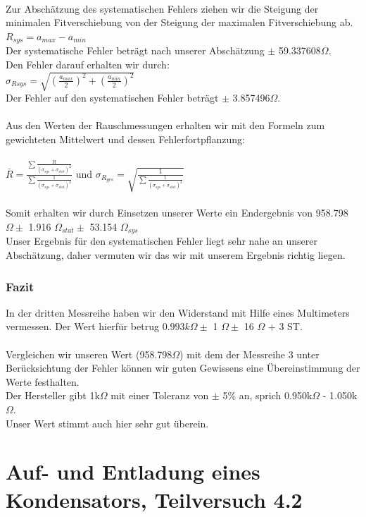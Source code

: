 \documentclass[12pt,a4paper]{article}
\begin{document}
\\Zur Abschätzung des systematischen Fehlers ziehen wir die Steigung der minimalen Fitverschiebung von der Steigung der maximalen Fitverschiebung ab.\\  
$R_{sys} = a_{max} - a_{min}$\\
Der systematische Fehler beträgt nach unserer Abschätzung $\pm$ 59.337608$\Omega$.\\ 
Den Fehler darauf erhalten wir durch:\\
$\sigma_{R sys} = \sqrt{(\frac{a_{max}}{2})^2+(\frac{a_{min}}{2})^2}$\\
Der Fehler auf den systematischen Fehler beträgt $\pm$ 3.857496$\Omega$.\\
\\Aus den Werten der Rauschmessungen erhalten wir mit den Formeln zum gewichteten Mittelwert und dessen Fehlerfortpflanzung:\\
\\$\bar{R} = \frac{\sum{\frac{R}{(\sigma_{sys}+\sigma_{stat})^2}}}{\sum{\frac{1}{(\sigma_{sys}+\sigma_{stat})^2}}}$ und $\sigma_{R_{ges}} = \sqrt{\frac{1}{\sum{\frac{1}{(\sigma_{sys}+\sigma_{stat})^2}}}}$\\
\\Somit erhalten wir durch Einsetzen unserer Werte ein Endergebnis von 958.798$\Omega \pm$ 1.916 $\Omega_{stat} \pm$ 53.154 $\Omega_{sys}$\\
Unser Ergebnis für den systematischen Fehler liegt sehr nahe an unserer Abschätzung, daher vermuten wir das wir mit unserem Ergebnis richtig liegen.\\ 
\subsubsection{Fazit}
In der dritten Messreihe haben wir den Widerstand mit Hilfe eines Multimeters vermessen. Der Wert hierfür betrug $0.993 k\Omega \pm$ 1 $\Omega \pm$ 16 $\Omega$ + 3 ST. \\ 
\\Vergleichen wir unseren Wert (958.798$\Omega$) mit dem der Messreihe 3 unter Berücksichtung der Fehler können wir guten Gewissens eine Übereinstimmung der Werte festhalten. 
\\Der Hersteller gibt 1k$\Omega$ mit einer Toleranz von $\pm$ 5\% an, sprich 0.950k$\Omega$ - 1.050k$\Omega$. 
\\Unser Wert stimmt auch hier sehr gut überein.  
\section{Auf- und Entladung eines Kondensators, Teilversuch 4.2}
\end{document}
